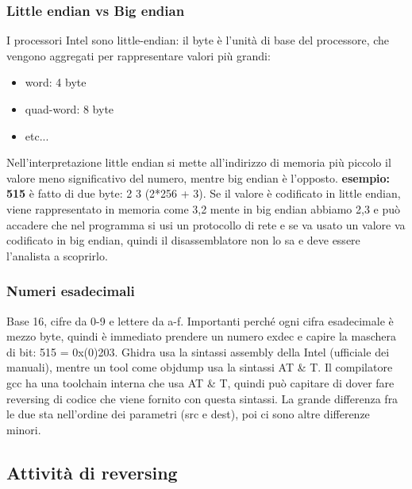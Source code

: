 \documentclass{article}
\begin{document}
\subsubsection{Little endian vs Big endian}
I processori Intel sono little-endian: il byte è l'unità di base del processore, che vengono aggregati per rappresentare valori più grandi:
\begin{itemize}
\item word: 4 byte
\item quad-word: 8 byte
\item etc...
\end{itemize}
Nell'interpretazione little endian si mette all'indirizzo di memoria più piccolo il valore meno significativo del numero, mentre big endian è l'opposto. \textbf{esempio: 515} è fatto di due byte: 2 3 (2*256 + 3). Se il valore è codificato in little endian, viene rappresentato in memoria come 3,2 mente in big endian abbiamo 2,3 e può accadere che nel programma si usi un protocollo di rete e se va usato un valore va codificato in big endian, quindi il disassemblatore non lo sa e deve essere l'analista a scoprirlo.
\subsubsection{Numeri esadecimali}
Base 16, cifre da 0-9 e lettere da a-f. Importanti perché ogni cifra esadecimale è mezzo byte, quindi è immediato prendere un numero exdec e capire la maschera di bit: 515 = 0x(0)203. Ghidra usa la sintassi assembly della Intel (ufficiale dei manuali), mentre un tool come objdump usa la sintassi AT \& T. Il compilatore gcc ha una toolchain interna che usa AT \& T, quindi può capitare di dover fare reversing di codice che viene fornito con questa sintassi. La grande differenza fra le due sta nell'ordine dei parametri (src e dest), poi ci sono altre differenze minori.
\subsection{Attività di reversing}
\end{document}
